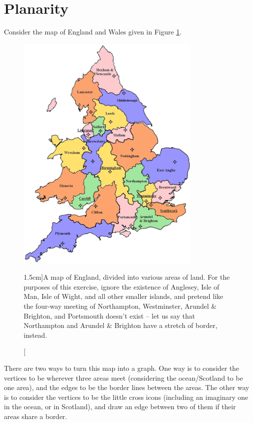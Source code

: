 \documentclass[nobib]{tufte-handout}
\begin{document}
\section{Planarity}

Consider the map of England and Wales given in Figure \ref{fig:england_wales_map}.

\begin{figure}
  \centering
  \includegraphics[width=0.8\textwidth]{graphics/L9_connectivity_planarity_colouring/england_wales_map.png}
  \caption[][1.5cm]{A map of England, divided into various areas of land. For the purposes of this exercise, ignore the existence of Anglesey, Isle of Man, Isle of Wight, and all other smaller islands, and pretend like the four-way meeting of Northampton, Westminster, Arundel \& Brighton, and Portsmouth doesn't exist -- let us say that Northampton and Arundel \& Brighton have a stretch of border, instead.}
  \label{fig:england_wales_map}
\end{figure}

There are two ways to turn this map into a graph. One way is to consider the vertices to be wherever three areas meet (considering the ocean/Scotland to be one area), and the edges to be the border lines between the areas. The other way is to consider the vertices to be the little cross icons (including an imaginary one in the ocean, or in Scotland), and draw an edge between two of them if their areas share a border.
\end{document}
